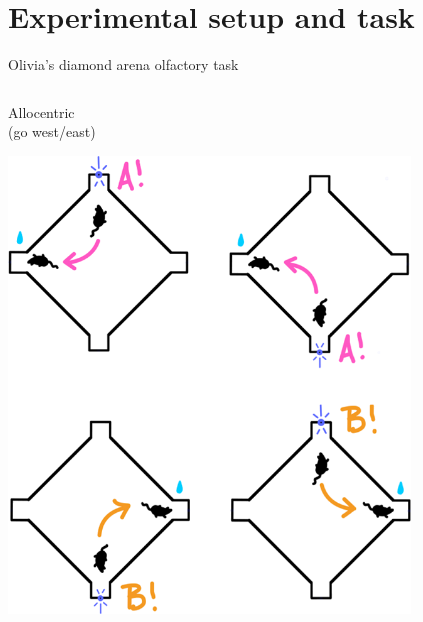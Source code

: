 \documentclass[bigger]{beamer}
\begin{document}
\section{Experimental setup and task}
\label{sec:org97c4284}
\begin{frame}[label={sec:org5124494}]{Olivia's diamond arena olfactory task}
\begin{columns}
\begin{column}[t]{0.5\columnwidth}
\center
Allocentric\\
(go west/east)
\begin{center}
\includegraphics[width=0.8\textwidth]{img/allocentric-task.png}
\end{center}
\end{column}


\end{columns}
\end{frame}
\end{document}
